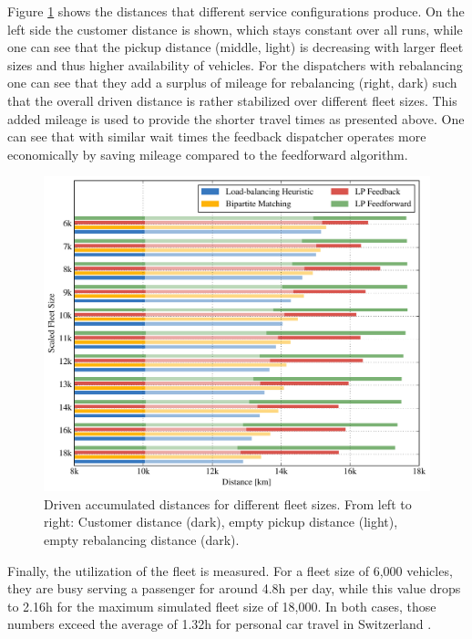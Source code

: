 
Figure \ref{fig:distances} shows the distances that different service configurations
produce. On the left side the customer distance is shown, which stays constant
over all runs, while one can see that the pickup distance (middle, light) is decreasing
with larger fleet sizes and thus higher availability of vehicles. For the dispatchers
with rebalancing one can see that they add a surplus of mileage for rebalancing (right, dark)
such that the overall driven distance is rather stabilized over different fleet sizes.
This added mileage is used to provide the shorter travel times as presented above.
One can see that with similar wait times the feedback dispatcher operates more economically
by saving mileage compared to the feedforward algorithm.

\begin{figure}
\includegraphics[width=1.0\textwidth]{figures/distances.pdf}
\caption{Driven accumulated distances for different fleet sizes. From left to right:
Customer distance (dark), empty pickup distance (light), empty rebalancing distance (dark).}
\label{fig:distances}
\end{figure}

Finally, the utilization of the fleet is measured. For a fleet size of 6,000
vehicles, they are busy serving a passenger for around 4.8h per day, while
this value drops to 2.16h for the maximum simulated fleet size of 18,000. In both cases,
those numbers exceed the average of 1.32h for personal car travel in Switzerland \cite{Bosch2016a}.

